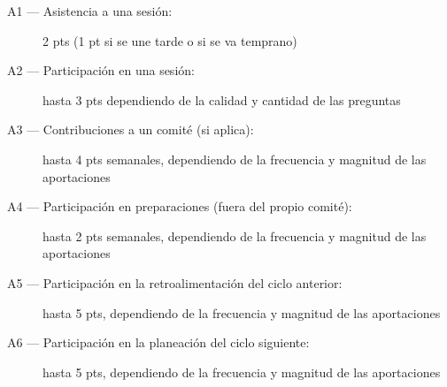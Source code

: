 \begin{description}
\item[A1 --- Asistencia a una sesi\'{o}n:]{2 pts (1 pt si se une tarde o si se
    va temprano)}
\item[A2 --- Participaci\'{o}n en una sesi\'{o}n:]{hasta 3 pts dependiendo de la
    calidad y cantidad de las preguntas}
\item[A3 --- Contribuciones a un comit\'{e} (si aplica):]{hasta 4 pts
    semanales, dependiendo de la frecuencia y magnitud de las
    aportaciones}
\item[A4 --- Participaci\'{o}n en preparaciones (fuera del propio
  comit\'{e}):]{hasta 2 pts semanales, dependiendo de la frecuencia y
    magnitud de las aportaciones}
\item[A5 --- Participaci\'{o}n en la retroalimentaci\'{o}n del ciclo
  anterior:]{hasta 5 pts, dependiendo de la frecuencia y magnitud de
    las aportaciones}
\item[A6 --- Participaci\'{o}n en la planeaci\'{o}n del ciclo siguiente:]{hasta 5
    pts, dependiendo de la frecuencia y magnitud de las aportaciones}
\end{description}
  